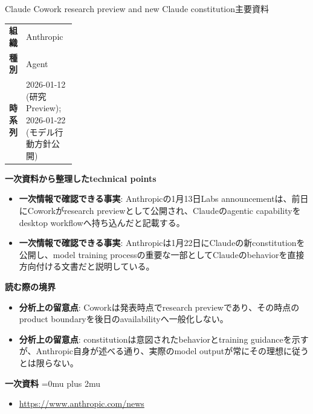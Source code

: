 \begin{technicalnote}{Claude Cowork research preview and new Claude constitution}{主要資料}
\begingroup
\begin{tabularx}{\linewidth}{@{}>{\bfseries}p{0.22\linewidth}X@{}}
組織 & Anthropic \\
種別 & Agent \\
時系列 & 2026-01-12 (研究Preview); 2026-01-22 (モデル行動方針公開) \\
\end{tabularx}
\smallskip
{\bfseries 一次資料から整理したtechnical points}
\begin{itemize}[leftmargin=1.5em,itemsep=0.35em]
\item \textbf{一次情報で確認できる事実}: Anthropicの1月13日Labs announcementは、前日にCoworkがresearch previewとして公開され、Claudeのagentic capabilityをdesktop workflowへ持ち込んだと記載する。
\item \textbf{一次情報で確認できる事実}: Anthropicは1月22日にClaudeの新constitutionを公開し、model training processの重要な一部としてClaudeのbehaviorを直接方向付ける文書だと説明している。
\end{itemize}
\begin{minipage}{\linewidth}
{\bfseries 読む際の境界}
\begin{itemize}[leftmargin=1.5em,itemsep=0.35em]
\item \textbf{分析上の留意点}: Coworkは発表時点でresearch previewであり、その時点のproduct boundaryを後日のavailabilityへ一般化しない。
\item \textbf{分析上の留意点}: constitutionは意図されたbehaviorとtraining guidanceを示すが、Anthropic自身が述べる通り、実際のmodel outputが常にその理想に従うとは限らない。
\end{itemize}
\begin{samepage}
{\bfseries 一次資料}
\begingroup\sloppy
\Urlmuskip=0mu plus 2mu\relax
\begin{itemize}[leftmargin=1.5em,itemsep=0.25em]
\item {\scriptsize\url{https://www.anthropic.com/news}}
\end{itemize}
\endgroup
\end{samepage}
\end{minipage}
\endgroup
\end{technicalnote}
\medskip

